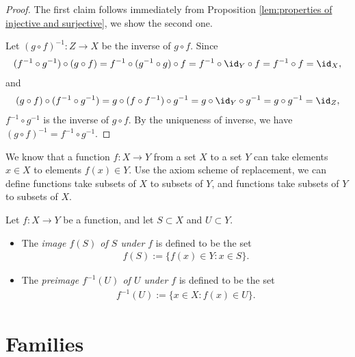 \begin{proof}
    The first claim follows immediately from Proposition \ref{lem:properties of injective and surjective}, we show the second one.

    Let $(g \circ f)^{-1} : Z \to X$ be the inverse of $g \circ f$. Since
    \begin{align*}
        (f^{-1} \circ g^{-1}) \circ (g \circ f)
        = f^{-1} \circ (g^{-1} \circ g) \circ f
        = f^{-1} \circ \id_Y \circ f
        = f^{-1} \circ f
        = \id_X,
    \end{align*}
    and
    \begin{align*}
        (g \circ f) \circ (f^{-1} \circ g^{-1})
        = g \circ (f \circ f^{-1}) \circ g^{-1}
        = g \circ \id_Y \circ g^{-1}
        = g \circ g^{-1}
        = \id_Z,
    \end{align*}
    $f^{-1} \circ g^{-1}$ is the inverse of $g \circ f$. By the uniqueness of inverse, we have $(g \circ f)^{-1} = f^{-1} \circ g^{-1}$.
\end{proof}

We know that a function $f : X \to Y$ from a set $X$ to a set $Y$ can take elements $x \in X$ to elements $f(x) \in Y$. Use the axiom scheme of replacement, we can define functions take subsets of $X$ to subsets of $Y$, and functions take subsets of $Y$ to subsets of $X$.

\begin{definition}
    Let $f : X \to Y$ be a function, and let $S \subset X$ and $U \subset Y$.
    \begin{itemize}
        \item The \emph{image $f(S)$ of $S$ under $f$} is defined to be the set
        \begin{align*}
            f(S) := \{f(x) \in Y : x \in S\}.
        \end{align*}
        \item The \emph{preimage $f^{-1}(U)$ of $U$ under $f$} is defined to be the set
        \begin{align*}
            f^{-1}(U) := \{x \in X : f(x) \in U\}.
        \end{align*}
    \end{itemize}
\end{definition}

\section{Families}

